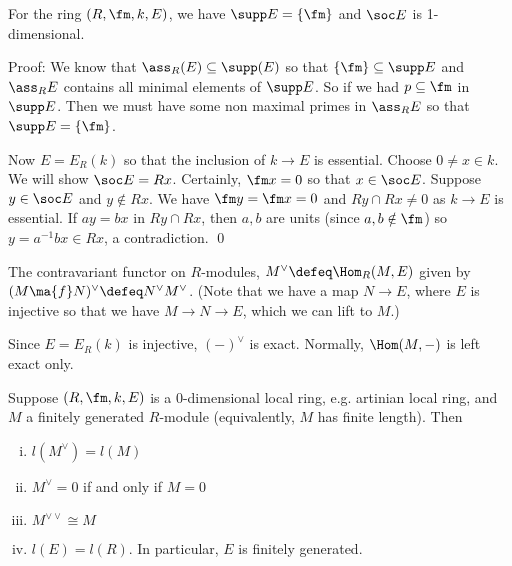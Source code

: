 \begin{prop}
For the ring $(R,\fm,k,E)$, we have $\supp E=\{\fm\}$ and $\soc E$ is 1-dimensional. 
\end{prop}

\noindent Proof: We know that $\ass_R(E) \subseteq \supp(E)$ so that $\{\fm\} \subseteq \supp E$ and $\ass_R E$ contains all minimal elements of $\supp E$. So if we had $p \subseteq \fm$ in $\supp E$. Then we must have some non maximal primes in $\ass_R E$ so that $\supp E=\{\fm\}$. 

Now $E=E_R(k)$ so that the inclusion of $k \to E$ is essential. Choose $0 \neq x \in k$. We will show $\soc E=Rx$. Certainly, $\fm x=0$ so that $x \in \soc E$. Suppose $y \in \soc E$ and $y \notin Rx$. We have $\fm y=\fm x=0$ and $Ry \cap Rx \neq 0$ as $k \to E$ is essential. If $ay=bx$ in $Ry \cap Rx$, then $a,b$ are units (since $a,b \notin \fm$) so $y=a^{-1}bx \in Rx$, a contradiction. \qed \\

\begin{dfn}
The contravariant functor on $R$-modules, $M^\vee \defeq \Hom_R(M,E)$ given by $(M \ma{f} N)^\vee \defeq N^\vee M^\vee$. (Note that we have a map $N \to E$, where $E$ is injective so that we have $M \to N \to E$, which we can lift to $M$.)
\end{dfn}

\begin{rem}
Since $E=E_R(k)$ is injective, $(-)^\vee$ is exact. Normally, $\Hom(M,-)$ is left exact only.
\end{rem}

\begin{thmm}
Suppose $(R,\fm,k,E)$ is a 0-dimensional local ring, e.g. artinian local ring, and $M$ a finitely generated $R$-module (equivalently, $M$ has finite length). Then
\begin{enumerate}[(i)]
\item $l(M^\vee)=l(M)$
\item $M^\vee=0$ if and only if $M=0$
\item $M^{\vee \vee} \cong M$
\item $l(E)=l(R)$. In particular, $E$ is finitely generated. 
\end{enumerate}
\end{thmm}

